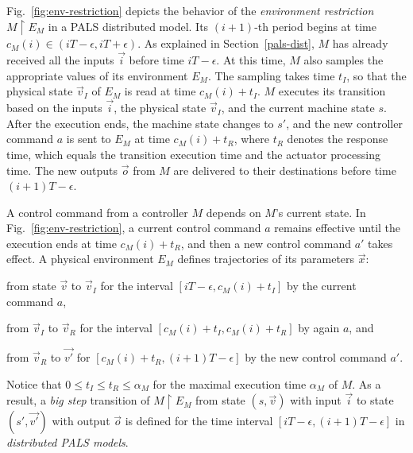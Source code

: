 Fig.~\ref{fig:env-restriction} depicts the behavior of 
the \emph{environment restriction} $M \restriction E_M$ %
in a PALS distributed model. %
Its $(i+1)$-th period begins  at time $c_M(i) \in (i T - \epsilon, i T + \epsilon)$. 
As explained in Section~\ref{pals-dist}, $M$ has already received all the inputs $\vec{i}$ %
before time $i T - \epsilon$.  At this time, $M$ also samples the
appropriate values of its environment $E_M$. The sampling takes time
$t_I$, so that 
the physical state $\vec{v}_I$ of $E_M$ is read at time $c_M(i) + t_I$.
$M$ executes its transition based on the inputs $\vec{i}$, the %
physical state $\vec{v}_I$,  and the current 
machine state $s$.
%
After the execution ends,
the machine state changes to  $s'$, and the new controller command $a$
is sent to $E_M$  at time  $c_M(i) + t_R$, %
where $t_R$ denotes the response time, 
which equals the transition execution time and the actuator processing time.
The new outputs $\vec{o}$ from $M$ are delivered to their destinations
before time $(i+1) T - \epsilon$.




A control command from a controller $M$ depends on $M$'s current  state.
In Fig.~\ref{fig:env-restriction}, a current control command $a$ %
remains effective 
until the execution ends at time $c_M(i) + t_R$,
and then a new control command $a'$ %
takes effect.
A physical environment 
$E_M$ defines trajectories of its parameters $\vec{x}$:
\begin{inparaenum}[(i)]
    \item from state $\vec{v}$ to $\vec{v}_I$ for the interval $[iT - \epsilon, c_M(i) + t_I]$ by the current command $a$,
    \item from $\vec{v}_I$ to $\vec{v}_R$ for the interval $[c_M(i) + t_I, c_M(i) + t_R]$ by again $a$, and 
    \item from $\vec{v}_R$ to $\vec{v'}$ for $[c_M(i) + t_R, (i+1)T-\epsilon]$ by the new control command $a'$.
\end{inparaenum}
Notice that $0 \leq t_I \leq t_R \leq \alpha_M$ for the maximal execution time $\alpha_M$  of $M$.
As a result,
a \emph{big step} transition of $M \restriction E_M$ from state $(s, \vec{v})$ with input $\vec{i}$ 
to state $(s',\vec{v'})$ with output $\vec{o}$
is defined for the time interval $[iT - \epsilon, (i+1)T-\epsilon]$ in \emph{distributed PALS models}.

